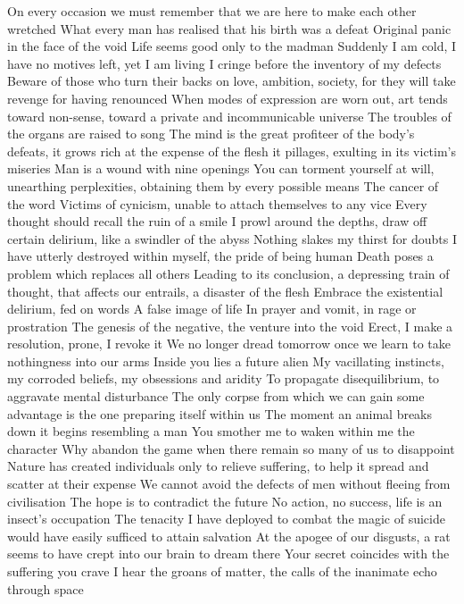 \documentclass{article}
\begin{document}
On every occasion we must remember that we are here to make each other wretched
What every man has realised that his birth was a defeat
Original panic in the face of the void
Life seems good only to the madman
Suddenly I am cold, I have no motives left, yet I am living
I cringe before the inventory of my defects
Beware of those who turn their backs on love, ambition, society, for they will take revenge for having renounced
When modes of expression are worn out, art tends toward non-sense, toward a private and incommunicable universe
The troubles of the organs are raised to song
The mind is the great profiteer of the body's defeats, it grows rich at the expense of the flesh it pillages, exulting in its victim's miseries
Man is a wound with nine openings
You can torment yourself at will, unearthing perplexities, obtaining them by every possible means
The cancer of the word
Victims of cynicism, unable to attach themselves to any vice
Every thought should recall the ruin of a smile
I prowl around the depths, draw off certain delirium, like a swindler of the abyss
Nothing slakes my thirst for doubts
I have utterly destroyed within myself, the pride of being human
Death poses a problem which replaces all others
Leading to its conclusion, a depressing train of thought, that affects our entrails, a disaster of the flesh
Embrace the existential delirium, fed on words
A false image of life
In prayer and vomit, in rage or prostration
The genesis of the negative, the venture into the void
Erect, I make a resolution, prone, I revoke it
We no longer dread tomorrow once we learn to take nothingness into our arms
Inside you lies a future alien
My vacillating instincts, my corroded beliefs, my obsessions and aridity
To propagate disequilibrium, to aggravate mental disturbance
The only corpse from which we can gain some advantage is the one preparing itself within us
The moment an animal breaks down it begins resembling a man
You smother me to waken within me the character
Why abandon the game when there remain so many of us to disappoint
Nature has created individuals only to relieve suffering, to help it spread and scatter at their expense
We cannot avoid the defects of men without fleeing from civilisation
The hope is to contradict the future
No action, no success, life is an insect's occupation
The tenacity I have deployed to combat the magic of suicide would have easily sufficed to attain salvation
At the apogee of our disgusts, a rat seems to have crept into our brain to dream there
Your secret coincides with the suffering you crave
I hear the groans of matter, the calls of the inanimate echo through space
\end{document}

